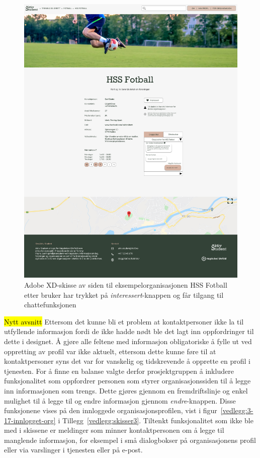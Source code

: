 \begin{figure}[H]
\centering
\includegraphics[width=.7\textwidth]{Illustrasjoner/Skisser-pdf/3.0/3-6-organisasjonsside-trykket-interessert.pdf}
\caption{Adobe XD-skisse av siden til eksempelorganisasjonen HSS Fotball etter bruker har trykket på {\em interessert}-knappen og får tilgang til chattefunksjonen}
\label{fig:3-6-org-trykket-interessert}
\end{figure}

\hl{Nytt avsnitt}
Ettersom det kunne bli et problem at kontaktpersoner ikke la til utfyllende informasjon fordi de ikke hadde nødt ble det lagt inn oppfordringer til dette i designet. Å gjøre alle feltene med informasjon obligatoriske å fylle ut ved oppretting av profil var ikke aktuelt, ettersom dette kunne føre til at kontaktpersoner syns det var for vanskelig og tidskrevende å opprette en profil i tjenesten. For å finne en balanse valgte derfor prosjektgruppen å inkludere funksjonalitet som oppfordrer personen som styrer organisasjonssiden til å legge inn informasjonen som trengs. Dette gjøres gjennom en fremdriftslinje og enkel mulighet til å legge til og endre informasjon gjennom {\em endre}-knappen. Disse funksjonene vises på den innloggede organisasjonsprofilen, vist i figur~\ref{vedlegg:3-17-innlogget-org} i Tillegg~\ref{vedlegg:skisser3}. Tiltenkt funksjonalitet som ikke ble med i skissene er meldinger som minner kontaktpersonen om å legge til manglende informasjon, for eksempel i små dialogbokser på organisasjonens profil eller via varslinger i tjenesten eller på e-post.


